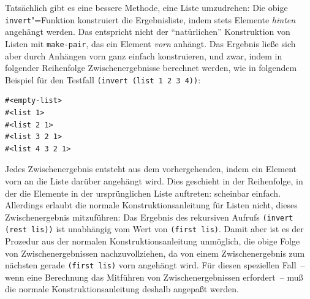 Tatsächlich gibt es eine bessere Methode, eine Liste umzudrehen: Die
obige \texttt{invert}"=Funktion konstruiert die Ergebnisliste, indem
stets Elemente \emph{hinten} angehängt werden.  Das entspricht 
nicht der "`natürlichen"' Konstruktion von Listen mit
\texttt{make-pair}, das ein Element \emph{vorn} anhängt.  
Das Ergebnis ließe sich aber durch Anhängen vorn ganz einfach
konstruieren, und zwar, indem in folgender Reihenfolge
Zwischenergebnisse berechnet werden, wie in folgendem Beispiel für den
Testfall \texttt{(invert (list 1 2 3 4))}:
%
\begin{verbatim}
#<empty-list>
#<list 1>
#<list 2 1>
#<list 3 2 1>
#<list 4 3 2 1>
\end{verbatim}
%
Jedes Zwischenergebnis entsteht aus dem vorhergehenden, indem ein
Element vorn an die Liste darüber angehängt wird.  Dies geschieht in
der Reihenfolge, in der die Elemente in der ursprünglichen Liste
auftreten: scheinbar einfach.  Allerdings erlaubt die normale
Konstruktionsanleitung für Listen nicht, dieses Zwischenergebnis
mitzuführen: Das Ergebnis des rekursiven Aufrufs \texttt{(invert (rest
  lis))} ist unabhängig vom Wert von \texttt{(first lis)}.  Damit aber
ist es der Prozedur aus der normalen Konstruktionsanleitung unmöglich,
die obige Folge von Zwischenergebnissen nachzuvollziehen, da von einem
Zwischenergebnis zum nächsten gerade \texttt{(first lis)} vorn
angehängt wird.  Für diesen speziellen Fall~-- wenn eine Berechnung das
Mitführen von Zwischenergebnissen erfordert~-- muß die normale
Konstruktionsanleitung deshalb angepaßt werden.

